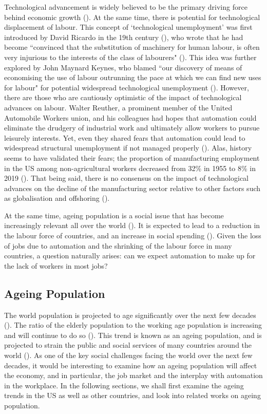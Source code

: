 \documentclass[11pt]{article}
\begin{document}
Technological advancement is widely believed to be the primary driving force behind economic growth (\cite{RePEc:ssa:lembks:dosietal-1988}). At the same time, there is potential for technological displacement of labour. This concept of `technological unemployment' was first introduced by David Ricardo in the 19th century (\cite{WoirolGregoryR1997Ttua}), who wrote that he had become ``convinced that the substitution of machinery for human labour, is often very injurious to the interests of the class of labourers" (\cite{10.1257/jep.33.2.229}). This idea was further explored by John Maynard Keynes, who blamed ``our discovery of means of economising the use of labour outrunning the pace at which we can find new uses for labour" for potential widespread technological unemployment (\cite{Keynes2010}). However, there are those who are cautiously optimistic of the impact of technological advances on labour. Walter Reuther, a prominent member of the United Automobile Workers union, and his colleagues had hopes that automation could eliminate the drudgery of industrial work and ultimately allow workers to pursue leisurely interests. Yet, even they shared fears that automation could lead to widespread structural unemployment if not managed properly (\cite{SteigerwaldDavid2010WRtU}). Alas, history seems to have validated their fears; the proportion of manufacturing employment in the US among non-agricultural workers decreased from 32\% in 1955 to 8\% in 2019 (\cite{rose_2021}). That being said, there is no consensus on the impact of technological advances on the decline of the manufacturing sector relative to other factors such as globalisation and offshoring (\cite{RoseElizabethL.2021TDoU,krugman2019globalization}).

At the same time, ageing population is a social issue that has become increasingly relevant all over the world (\cite{2002Wpa1}). It is expected to lead to a reduction in the labour force of countries, and an increase in social spending (\cite{marevsova2015economics}). Given the loss of jobs due to automation and the shrinking of the labour force in many countries, a question naturally arises: can we expect automation to make up for the lack of workers in most jobs?

\subsection{Ageing Population}
\label{subsec:ageingpopulation}

The world population is projected to age significantly over the next few decades (\cite{science}). The ratio of the elderly population to the working age population is increasing and will continue to do so (\cite{WHO}). This trend is known as an ageing population, and is projected to strain the public and social services of many countries around the world (\cite{publicservicesstrain}). As one of the key social challenges facing the world over the next few decades, it would be interesting to examine how an ageing population will affect the economy, and in particular, the job market and the interplay with automation in the workplace. In the following sections, we shall first examine the ageing trends in the US as well as other countries, and look into related works on ageing population.
\end{document}
